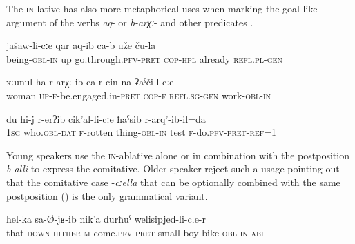 The \textsc{in}-lative has also more metaphorical uses when marking the goal-like argument of the verbs \textit{aq}-   or \textit{b-arχː}-   and other predicates .
%
\begin{exe}
	\ex	\label{They dedicated themselves to their life (i.e. they cared for their living}
	\gll	jašaw-li-cːe	qar	aq-ib ca-b	uže	ču-la\\
		being-\textsc{obl-in}	up	go.through.\textsc{pfv}-\textsc{pret} \textsc{cop-hpl}	already	\textsc{refl}.\textsc{pl}-\textsc{gen}\\
	\glt	{}

	\ex	\label{The wife is engaged in her work}
	\gll	xːunul	ha-r-arχː-ib ca-r	cin-na	ʡaˁči-l-cːe \\
		woman	\textsc{up-f}-be.engaged.in-\textsc{pret} \textsc{cop-f}	\textsc{refl}.\textsc{sg}-\textsc{gen}	work-\textsc{obl-in}\\
	\glt	{}

	\ex	\label{Other (people) considered myself as rotten}
	\gll	du	hi-j	r-erʔib	cik'al-li-cːe	ħaˁsib	r-arq'-ib-il=da\\
		1\textsc{sg}	who.\textsc{obl}-\textsc{dat}	\textsc{f}-rotten	thing-\textsc{obl-in}	test	\textsc{f}-do.\textsc{pfv}-\textsc{pret}-\textsc{ref}=1\\
	\glt	{}
\end{exe}

Young speakers use the \textsc{in}-ablative alone  or in combination with the postposition \textit{b-alli}  to express the comitative. Older speaker reject such a usage pointing out that the comitative case -\textit{cːella} that can be optionally combined with the same postposition () is the only grammatical variant.
%
\begin{exe}
	\ex	\label{From over there a little boy with a bike came}
	\gll	hel-ka	sa-Ø-jʁ-ib	nik'a	durħuˁ	welisipjed-li-cːe-r\\
		that-\textsc{down}	\textsc{hither-m}-come.\textsc{pfv}-\textsc{pret}	small	boy	bike-\textsc{obl}-\textsc{in}-\textsc{abl}\\
	\glt	{}
\end{exe}

